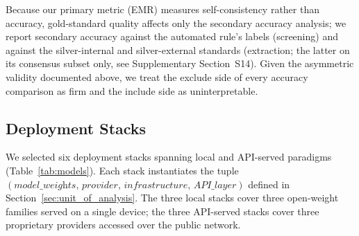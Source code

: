 \documentclass[preprint,review,12pt,authoryear]{elsarticle}
\begin{document}
Because our primary metric (EMR) measures self-consistency rather than accuracy, gold-standard quality affects only the secondary accuracy analysis; we report secondary accuracy against the automated rule's labels (screening) and against the silver-internal and silver-external standards (extraction; the latter on its consensus subset only, see Supplementary Section~S14).
Given the asymmetric validity documented above, we treat the exclude side of every accuracy comparison as firm and the include side as uninterpretable.

\subsection{Deployment Stacks}

We selected six deployment stacks spanning local and API-served paradigms (Table~\ref{tab:models}).
Each stack instantiates the tuple $(\textit{model\_weights},\,\textit{provider},\,\textit{infrastructure},\,\textit{API\_layer})$ defined in Section~\ref{sec:unit_of_analysis}.
The three local stacks cover three open-weight families served on a single device; the three API-served stacks cover three proprietary providers accessed over the public network.
\end{document}
